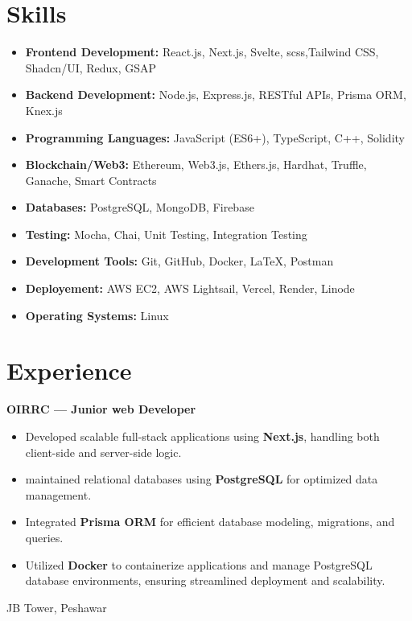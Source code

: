\documentclass[10pt, letterpaper]{article}
\newenvironment{highlights}{
    \begin{itemize}[
        topsep=0.10 cm,
        parsep=0.10 cm,
        partopsep=0pt,
        itemsep=0pt,
        leftmargin=0.4 cm + 10pt
    ]
}{
    \end{itemize}
}
\newenvironment{twocolentry}[2][]{
    \onecolentry
    \def\secondColumn{#2}
    \setcolumnwidth{\fill, 4.5 cm}
    \begin{paracol}{2}
}{
    \switchcolumn \raggedleft \secondColumn
    \end{paracol}
    \endonecolentry
}
\begin{document}
\section{Skills}
\begin{highlights}
	\item \textbf{Frontend Development:} React.js, Next.js, Svelte, scss,Tailwind CSS, Shadcn/UI, Redux, GSAP
	\item \textbf{Backend Development:} Node.js, Express.js, RESTful APIs, Prisma ORM, Knex.js
	\item \textbf{Programming Languages:} JavaScript (ES6+), TypeScript, C++, Solidity
	\item \textbf{Blockchain/Web3:} Ethereum, Web3.js, Ethers.js, Hardhat, Truffle, Ganache, Smart Contracts
	\item \textbf{Databases:} PostgreSQL, MongoDB, Firebase
	\item \textbf{Testing:} Mocha, Chai, Unit Testing, Integration Testing
	\item \textbf{Development Tools:} Git, GitHub, Docker, LaTeX, Postman
	\item \textbf{Deployement:} AWS EC2, AWS Lightsail, Vercel, Render, Linode
	\item \textbf{Operating Systems:} Linux
\end{highlights}
\section{Experience}

\begin{twocolentry}{
		JB Tower, Peshawar \\
	}
	\textbf{OIRRC — Junior web Developer}
	\begin{highlights}
		\item Developed scalable full-stack applications using \textbf{Next.js}, handling both client-side and server-side logic.
		\item maintained relational databases using \textbf{PostgreSQL} for optimized data management.
		\item Integrated \textbf{Prisma ORM} for efficient database modeling, migrations, and queries.
		\item Utilized \textbf{Docker} to containerize applications and manage PostgreSQL database environments, ensuring streamlined deployment and scalability.
	\end{highlights}
\end{twocolentry}
\end{document}
